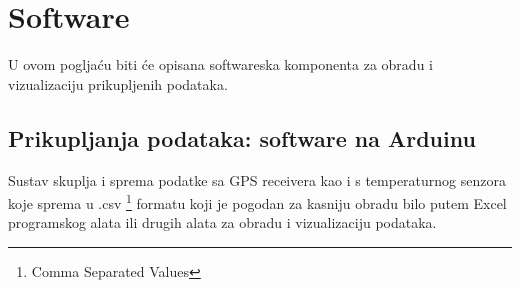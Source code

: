 \chapter{Software}
U ovom pogljaću biti će opisana softwareska komponenta za obradu i vizualizaciju prikupljenih podataka.
\section{Prikupljanja podataka: software na Arduinu}
Sustav skuplja i sprema podatke sa GPS receivera kao i s temperaturnog senzora koje sprema u .csv \footnote{Comma Separated Values} formatu koji je pogodan za kasniju obradu bilo putem Excel programskog alata ili drugih alata za obradu i vizualizaciju podataka.


